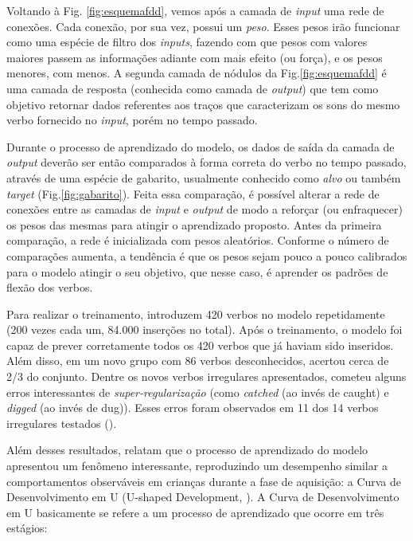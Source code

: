 Voltando à Fig. \ref{fig:esquemafdd}, vemos após a camada de \textit{input} uma rede de conexões. Cada conexão, por sua vez, possui um \textit{peso}. Esses pesos irão funcionar como uma espécie de filtro dos \textit{inputs}, fazendo com que pesos com valores maiores passem as informações adiante com mais efeito (ou força), e os pesos menores, com menos. A segunda camada de nódulos da Fig.\ref{fig:esquemafdd} é uma camada de resposta (conhecida como camada de \textit{output}) que tem como objetivo retornar dados referentes aos traços que caracterizam os sons do mesmo verbo fornecido no \textit{input}, porém no tempo passado. 

Durante o processo de aprendizado do modelo, os dados de saída da camada de \textit{output} deverão ser então comparados à forma correta do verbo no tempo passado, através de uma espécie de gabarito, usualmente conhecido como \textit{alvo} ou também \textit{target} (Fig.\ref{fig:gabarito}). Feita essa comparação, é possível alterar a rede de conexões entre as camadas de \textit{input} e \textit{output} de modo a reforçar (ou enfraquecer) os pesos das mesmas para atingir o aprendizado proposto. Antes da primeira comparação, a rede é inicializada com pesos aleatórios. Conforme o número de comparações aumenta, a tendência é que os pesos sejam pouco a pouco calibrados para o modelo atingir o seu objetivo, que nesse caso, é aprender os padrões de flexão dos verbos.



Para realizar o treinamento, \cite{rumelhart:1986} introduzem 420 verbos no modelo repetidamente (200 vezes cada um, 84.000 inserções no total).  Após o treinamento, o modelo foi capaz de prever corretamente todos os 420 verbos que já haviam sido inseridos. Além disso, em um novo grupo com 86 verbos desconhecidos, acertou cerca de 2/3 do conjunto. Dentre os novos verbos irregulares apresentados, cometeu alguns erros interessantes de \textit{super-regularização} (como \textit{catched} (ao invés de caught) e \textit{digged} (ao invés de dug)). Esses erros foram observados em 11 dos 14 verbos irregulares testados (\cite{pinker:1993}).  

Além desses resultados, \cite{rumelhart:1986} relatam que o processo de aprendizado do modelo apresentou um fenômeno interessante, reproduzindo um desempenho similar a comportamentos observáveis em crianças durante a fase de aquisição: a Curva de Desenvolvimento em U (U-shaped Development, \cite{marcus:1992}). A Curva de Desenvolvimento em U basicamente se refere a um processo de aprendizado que ocorre em três estágios: \\

